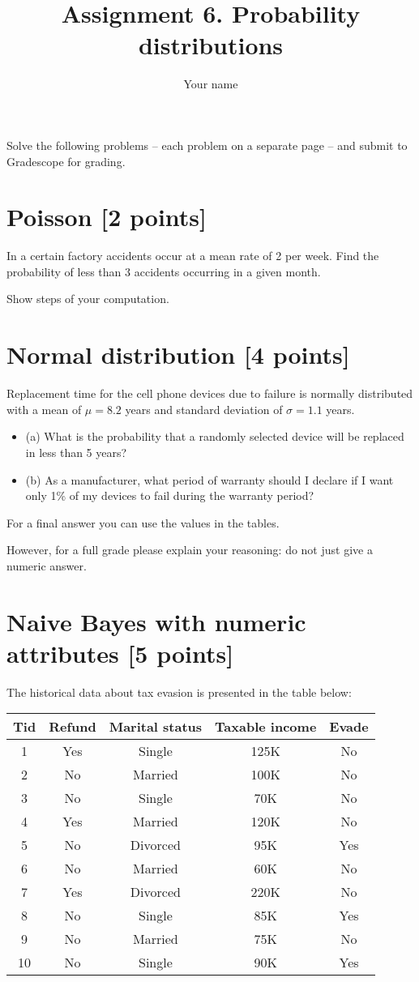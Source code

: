 \documentclass{article}
\title{Assignment 6. Probability distributions}
\author{Your name}
\begin{document}
\maketitle


Solve the following problems -- each problem on a separate page -- and submit to Gradescope for grading. 

\newpage
\section{Poisson [2 points]}
In a certain factory accidents occur at a mean rate of 2 per week. Find the probability of less than 3 accidents occurring in a given month.


Show steps of your computation.

\newpage
\section{Normal distribution [4 points]}
Replacement time for the cell phone devices due to failure is normally distributed with a mean of $\mu=8.2$ years and standard deviation of $\sigma = 1.1$ years. 
\begin{itemize}
    \item (a) What is the probability that a randomly selected device will be replaced in less than 5 years?
    \item (b) As a manufacturer, what period of warranty should I declare if I want only 1\% of my devices to fail during the warranty period?
\end{itemize}


For a final answer you can use the values in the tables.

However, for a full grade please explain your reasoning: do not just give a numeric answer. 

\newpage
\section{Naive Bayes with numeric attributes [5 points]}
The historical data about tax evasion is presented in the table below:
\begin{center}
\begin{tabular}{ |c|c|c|c|c| } 
 \hline
Tid & Refund & Marital status & Taxable income & Evade \\
 \hline
1 & Yes & Single & 125K & No \\
2 & No & Married & 100K & No \\ 
3 & No & Single & 70K & No \\ 
4 & Yes & Married & 120K & No \\ 
5 & No & Divorced & 95K & Yes \\ 
6 & No & Married & 60K & No \\ 
7 & Yes & Divorced & 220K & No \\ 
8 & No & Single & 85K & Yes \\ 
9 & No & Married & 75K & No \\ 
10 & No & Single & 90K & Yes \\ 
 \hline
\end{tabular}
\end{center}
\end{document}
